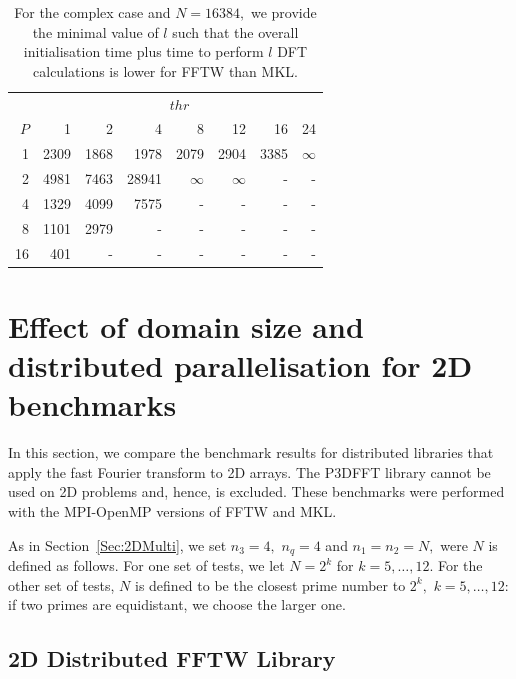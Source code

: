 \documentclass[a4paper]{article}
\begin{document}
\begin{table}
\begin{center}
\begin{tabular}{|r||r|r|r|r|r|r|r|}
  \hline
 & \multicolumn{7}{|c|}{$thr$} \\
$P$ & 1 & 2 & 4 & 8 & 12 & 16 & 24 \\ \hline
  1 &    2309 &   1868 &  1978 &  2079 &  2904 &  3385 & $\infty$   \\
  2 &     4981 &  7463 &  28941 & $\infty$ &  $\infty$ &           - &           - \\
  4 &     1329 &  4099 &   7575 &           - &          - &          - &          - \\
  8 &    1101 &   2979  &         - &          - &          - &          - &          - \\
  16 &    401 &          - &          - &          - &          - &          - &          - \\ \hline
\end{tabular}
\caption{ For the complex case and $N=16384,$ we provide the minimal value of $l$ such that the overall initialisation time plus time to perform $l$ DFT calculations is lower for FFTW than MKL.  }\label{Tbl1Dl}
\end{center}
\end{table}

\clearpage

\section{Effect of domain size and distributed parallelisation for 2D benchmarks}\label{Sec:2DDistr}


In this section, we compare the benchmark results for distributed
libraries that apply the fast Fourier transform to 2D arrays.  The
P3DFFT library cannot be used on 2D problems and, hence, is
excluded. These benchmarks were performed with the MPI-OpenMP versions
of FFTW and MKL. 

As in Section~\ref{Sec:2DMulti}, we set $n_3=4,$ $n_q=4$ and $n_1=n_2=N,$ were $N$ is
defined as follows.  For one set of tests, we let $N=2^k$ for
$k=5,\ldots,12.$ For the other set of tests, $N$ is defined to be the
closest prime number to $2^k,$ $k=5,\ldots,12:$ if two primes are
equidistant, we choose the larger one.

\subsection{2D Distributed FFTW Library}\label{Sec:2DDistFFTW}
\end{document}
